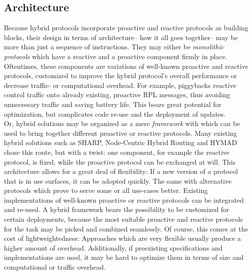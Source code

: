 \documentclass[a4paper,10pt]{scrartcl}
\begin{document}
\subsection{Architecture}
\label{subsec:architecture}
Because hybrid protocols incorporate proactive and reactive protocols as building blocks, their design in terms of architecture-- how it all goes together-- may be more than just a sequence of instructions. 
They may either be \emph{monolithic protocols} which have a reactive and a proactive component firmly in place. Oftentimes, these components are variations of well-known proactive and reactive protocols, customized to improve the hybrid protocol's overall performance or decrease traffic- or computational overhead. For example, \cite{baccelli_p2p_rpl} piggybacks reactive control traffic onto already existing, proactive RPL messages, thus avoiding unnecessary traffic and saving battery life. 
This bears great potential for optimization, but complicates code re-use and the deployment of updates.\\
Or, hybrid solutions may be organized as a mere \emph{framework} with which can be used to bring together different proactive or reactive protocols. Many existing hybrid solutions such as SHARP, Node-Centric Hybrid Routing and HYMAD chose this route, but with a twist: one component, for example the reactive protocol, is fixed, while the proactive protocol can be exchanged at will. This architecture allows for a great deal of flexibility: If a new version of a protocol that is in use surfaces, it can be adopted quickly. The same with alternative protocols which prove to serve some or all use-cases better. Existing implementations of well-known proactive or reactive protocols can be integrated and re-used.
A hybrid framework bears the possibility to be customized for certain deployments, because the most suitable proactive and reactive protocols for the task may be picked and combined seamlessly.
Of course, this comes at the cost of lightweightedness: Approaches which are very flexible usually produce a higher amount of overhead. Additionally, if preexisting specifications and implementations are used, it may be hard to optimize them in terms of size and computational or traffic overhead.


\end{document}
